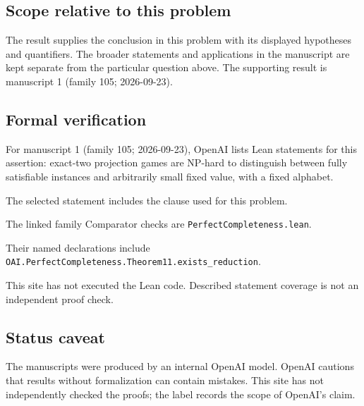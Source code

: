 \documentclass[11pt]{article}
\begin{document}
\subsection{Scope relative to this problem}
The result supplies the conclusion in this problem with its displayed hypotheses and quantifiers. The broader statements and applications in the manuscript are kept separate from the particular question above. The supporting result is manuscript 1 (family 105; 2026-09-23).

\subsection{Formal verification}
For manuscript 1 (family 105; 2026-09-23), OpenAI lists Lean statements for this assertion: exact-two projection games are NP-hard to distinguish between fully satisfiable instances and arbitrarily small fixed value, with a fixed alphabet.

The selected statement includes the clause used for this problem.

The linked family Comparator checks are \texttt{PerfectCompleteness.lean}.

Their named declarations include \texttt{OAI.PerfectCompleteness.Theorem11.exists\_reduction}.

This site has not executed the Lean code. Described statement coverage is not an independent proof check.

\subsection{Status caveat}
The manuscripts were produced by an internal OpenAI model. OpenAI cautions that results without formalization can contain mistakes. This site has not independently checked the proofs; the label records the scope of OpenAI's claim.
\end{document}
